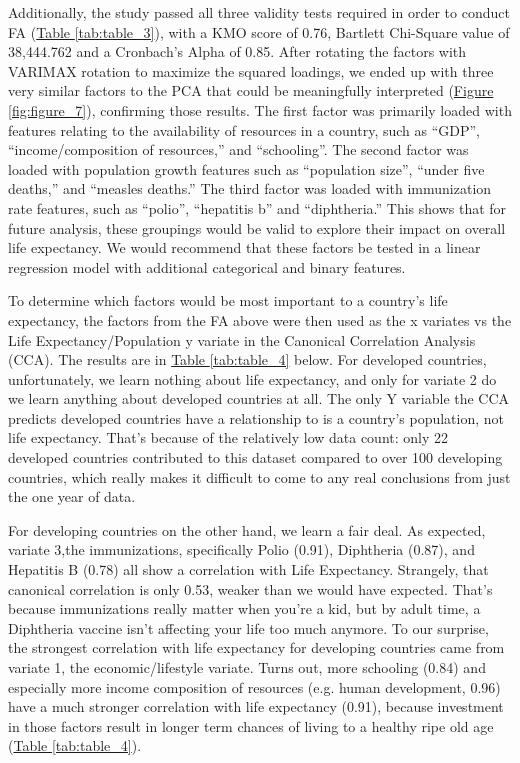 \documentclass[12pt]{article}
\begin{document}
\begin{multicols}{2}
Additionally, the study passed all three validity tests required in order to conduct FA (\hyperref[tab:table_3]{Table \ref{tab:table_3}}), with a KMO score of 0.76, Bartlett Chi-Square value of 38,444.762 and a Cronbach’s Alpha of 0.85. After rotating the factors with VARIMAX rotation to maximize the squared loadings, we ended up with three very similar factors to the PCA that could be meaningfully interpreted (\hyperref[fig:figure_7]{Figure \ref{fig:figure_7}}), confirming those results. The first factor was primarily loaded with features relating to the availability of resources in a country, such as “GDP”, “income/composition of resources,” and “schooling”. The second factor was loaded with population growth features such as “population size”, “under five deaths,” and “measles deaths.” The third factor was loaded  with immunization rate features, such as “polio”, “hepatitis b” and “diphtheria.” This shows that for future analysis, these groupings would be valid to explore their impact on overall life expectancy. We would recommend that these factors be tested in a linear regression model with additional categorical and binary features. 

To determine which factors would be most important to a country’s life expectancy, the factors from the FA above were then used as the x variates vs the Life Expectancy/Population y variate in the Canonical Correlation Analysis (CCA). The results are in \hyperref[tab:table_4]{Table \ref{tab:table_4}} below. For developed countries, unfortunately, we learn nothing about life expectancy, and only for variate 2 do we learn anything about developed countries at all. The only Y variable the CCA predicts developed countries have a relationship to is a country’s population, not life expectancy. That’s because of the relatively low data count: only 22 developed countries contributed to this dataset compared to over 100 developing countries, which really makes it difficult to come to any real conclusions from just the one year of data. 

For developing countries on the other hand, we learn a fair deal. As expected, variate 3,the immunizations, specifically Polio (0.91), Diphtheria (0.87), and Hepatitis B (0.78) all show a correlation with Life Expectancy. Strangely, that canonical correlation is only 0.53, weaker than we would have expected. That’s because immunizations really matter when you’re a kid, but by adult time, a Diphtheria vaccine isn’t affecting your life too much anymore. To our surprise, the strongest correlation with life expectancy for developing countries came from variate 1, the economic/lifestyle variate. Turns out, more schooling (0.84) and especially more income composition of resources (e.g. human development, 0.96) have a much stronger correlation with life expectancy (0.91), because investment in those factors result in longer term chances of living to a healthy ripe old age (\hyperref[tab:table_4]{Table \ref{tab:table_4}}).


\end{multicols}
\end{document}
